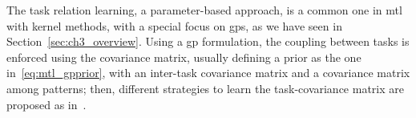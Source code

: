 


    The task relation learning, a parameter-based approach, is a common one in \acrshort{mtl} with kernel methods, with a special focus on \acrshort{gps}, as we have seen in Section~\ref{sec:ch3_overview}. Using a \acrshort{gp} formulation, the coupling between tasks is enforced using the covariance matrix, usually defining a prior as the one in~\eqref{eq:mtl_gpprior}, with an inter-task covariance matrix and a covariance matrix among patterns;
    then, different strategies to learn the task-covariance matrix are proposed as in~\cite{LawrenceP04, BonillaCW07}. 




